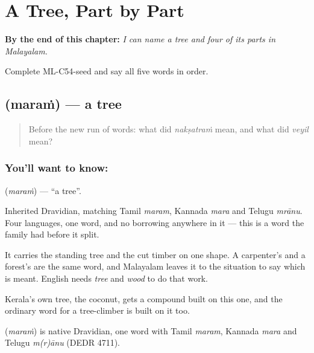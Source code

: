 
\chapter{A Tree, Part by Part}
\label{ch:ml-a-tree-part-by-part}

\begin{chapteropening}
\textbf{By the end of this chapter:} \emph{I can name a tree and four of its parts in Malayalam.}

Complete ML-C54-seed and say all five words in order.
\end{chapteropening}

\section[\texorpdfstring{\ml{മരം} (maraṁ)}{മരം (maraṁ)}]{ (maraṁ) — a tree}

\label{lesson:ML-C54-tree}



\begin{quote}
Before the new run of words: what did \emph{nakṣatraṁ} mean, and what did \emph{veyil} mean?
\end{quote}

\subsection*{You'll want to know: }
\textbf{} (\emph{maraṁ}) — \textquotedblleft{}a tree\textquotedblright{}.

Inherited Dravidian, matching Tamil \emph{maram}, Kannada \emph{mara} and Telugu \emph{mrānu}. Four languages, one word, and no borrowing anywhere in it — this is a word the family had before it split.

It carries the standing tree and the cut timber on one shape. A carpenter's  and a forest's  are the same word, and Malayalam leaves it to the situation to say which is meant. English needs \emph{tree} and \emph{wood} to do that work.

Kerala's own tree, the coconut, gets a compound built on this one, and the ordinary word for a tree-climber is built on it too.

\begin{cousinweb}
\textbf{} (\emph{maraṁ}) is native Dravidian, one word with Tamil \emph{maram}, Kannada \emph{mara} and Telugu \emph{m(r)ānu} (DEDR 4711).
\end{cousinweb}

